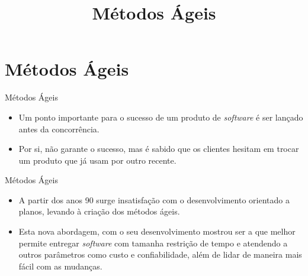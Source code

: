 \documentclass[11pt]{beamer}
\title{Métodos Ágeis}
\author{}
\date{}
\begin{document}
    \begin{frame}[plain]
        \titlepage
    \end{frame}

   \section{Métodos Ágeis}

    \begin{frame}{Métodos Ágeis}
      \begin{itemize}
         \item Um ponto importante para o sucesso de um produto de \textit{software} é ser lançado antes da concorrência.
         \item Por si, não garante o sucesso, mas é sabido que os clientes hesitam em trocar um produto que já usam por outro recente.
      \end{itemize}
    \end{frame}

    \begin{frame}{Métodos Ágeis}
      \begin{itemize}
         \item A partir dos anos 90 surge insatisfação com o desenvolvimento orientado a planos, levando à criação dos métodos ágeis.
         \item Esta nova abordagem, com o seu desenvolvimento mostrou ser a que melhor permite entregar \textit{software} com tamanha restrição de tempo e atendendo a outros parâmetros como custo e confiabilidade, além de lidar de maneira mais fácil com as mudanças.
      \end{itemize}
    \end{frame}
\end{document}
